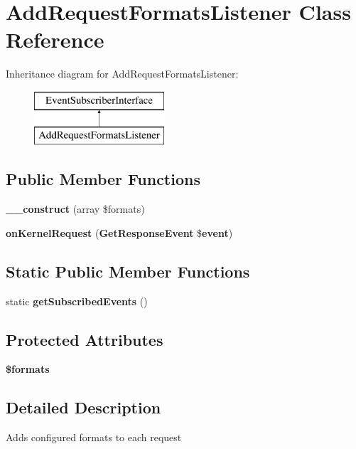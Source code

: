 \section{Add\+Request\+Formats\+Listener Class Reference}
\label{class_symfony_1_1_component_1_1_http_kernel_1_1_event_listener_1_1_add_request_formats_listener}
Inheritance diagram for Add\+Request\+Formats\+Listener\+:\begin{figure}[H]
\begin{center}
\leavevmode
\includegraphics[height=2.000000cm]{class_symfony_1_1_component_1_1_http_kernel_1_1_event_listener_1_1_add_request_formats_listener}
\end{center}
\end{figure}
\subsection*{Public Member Functions}
\begin{DoxyCompactItemize}
\item 
{\bf \+\_\+\+\_\+construct} (array \$formats)
\item 
{\bf on\+Kernel\+Request} ({\bf Get\+Response\+Event} \${\bf event})
\end{DoxyCompactItemize}
\subsection*{Static Public Member Functions}
\begin{DoxyCompactItemize}
\item 
static {\bf get\+Subscribed\+Events} ()
\end{DoxyCompactItemize}
\subsection*{Protected Attributes}
\begin{DoxyCompactItemize}
\item 
{\bf \$formats}
\end{DoxyCompactItemize}


\subsection{Detailed Description}
Adds configured formats to each request

